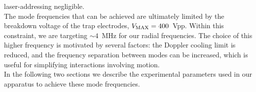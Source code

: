     laser-addressing negligible.\\ The mode frequencies that can be achieved are
    ultimately limited by the breakdown voltage of the trap electrodes, $V_{\rm
    MAX} = 400$~Vpp. Within this constraint, we are targeting $\sim 4$~MHz for
    our radial frequencies. The choice of this higher frequency is motivated by
    several factors: the Doppler cooling limit is reduced, and the frequency
    separation between modes can be increased, which is useful for simplifying
    interactions involving motion.\\ 
    In the following two sections we describe the experimental parameters used
    in our apparatus to achieve these mode frequencies.\\



